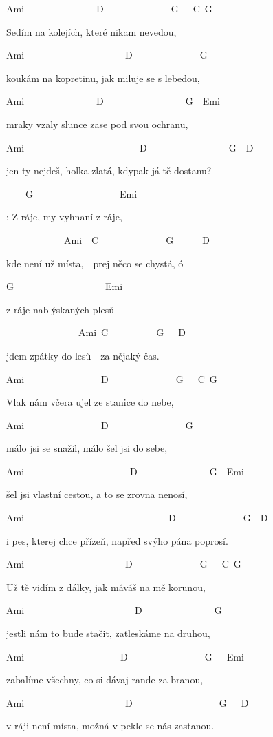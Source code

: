 
Ami\7~~~~~~~~~~~~~~~D\7~~~~~~~~~~~~~~G~~~C~G

Sedím na kolejích, které nikam nevedou,

Ami\7~~~~~~~~~~~~~~~~~~~~~D\7~~~~~~~~~~~~~~G

koukám na kopretinu, jak miluje se s lebedou,

Ami\7~~~~~~~~~~~~~~~D\7~~~~~~~~~~~~~~~~~G~~Emi

mraky vzaly slunce zase pod svou ochranu,

Ami\7~~~~~~~~~~~~~~~~~~~~~~~~D\7~~~~~~~~~~~~~~~~~G~~D\7

jen ty nejdeš, holka zlatá, kdypak já tě dostanu?

\bigskip

\begin{chorustext}
~~~~G~~~~~~~~~~~~~~~~~~Emi

\chorus: Z ráje, my vyhnaní z ráje,

~~~~~~~~~~~~Ami\7~~C~~~~~~~~~~~~~~G~~~~~~D\7

kde není už místa,~~prej něco se chystá, ó 

G~~~~~~~~~~~~~~~~~~~Emi

z ráje nablýskaných plesů

~~~~~~~~~~~~~~~Ami\7~C~~~~~~~~~~G~~~D\7

jdem zpátky do lesů~~za nějaký čas.
\end{chorustext}

\bigskip

Ami\7~~~~~~~~~~~~~~~~D\7~~~~~~~~~~~~~~G~~~C~G

Vlak nám včera ujel ze stanice do nebe,

Ami\7~~~~~~~~~~~~~~~~D\7~~~~~~~~~~~~~~~~G

málo jsi se snažil, málo šel jsi do sebe,

Ami\7~~~~~~~~~~~~~~~~~~~~~~D\7~~~~~~~~~~~~~~~G~~Emi

šel jsi vlastní cestou, a to se zrovna nenosí,

Ami\7~~~~~~~~~~~~~~~~~~~~~~~~~~~~~~D\7~~~~~~~~~~~~~~G~~D\7

i pes, kterej chce přízeň, napřed svýho pána poprosí.

\bigskip

\chorus

\bigskip

Ami\7~~~~~~~~~~~~~~~~~~~~~D\7~~~~~~~~~~~~~~G~~~C~G

Už tě vidím z dálky, jak máváš na mě korunou,

Ami\7~~~~~~~~~~~~~~~~~~~~~~~D\7~~~~~~~~~~~~~~~G

jestli nám to bude stačit, zatleskáme na druhou,

Ami\7~~~~~~~~~~~~~~~~~~~~D\7~~~~~~~~~~~~~~~~G~~~Emi

zabalíme všechny, co si dávaj rande za branou,

Ami\7~~~~~~~~~~~~~~~~~~~~~D\7~~~~~~~~~~~~~~~~~~G~~~D\7

v ráji není místa, možná v pekle se nás zastanou. 

\bigskip

\chorus